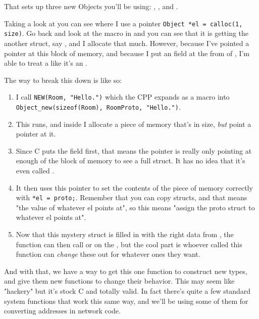 That sets up three new Objects you'll be using: , ,
and .

Taking a look at  you can see where I use a pointer
\verb|Object *el = calloc(1, size)|.  Go back and look at the 
macro in  and you can see that it is getting the 
another struct, say , and I allocate that much.  However, because
I've pointed a  pointer at this block of memory, and because
I put an  field at the from of , I'm able
to treat a  like it's an .

The way to break this down is like so:

\begin{enumerate}
\item I call \verb|NEW(Room, "Hello.")| which the CPP expands as a macro
    into \verb|Object_new(sizeof(Room), RoomProto, "Hello.")|.
\item This runs, and inside  I allocate a piece of memory
    that's  in size, \emph{but} point a  pointer
    at it.
\item Since C puts the  field first, that means the 
    pointer is really only pointing at enough of the block of memory to
    see a full  struct.  It has no idea that it's even called
    .
\item It then uses this  pointer to set the contents of
    the piece of memory correctly with \verb|*el = proto;|.  Remember that
    you can copy structs, and that  means "the value of whatever el points
    at", so this means "assign the proto struct to whatever el points at".
\item Now that this mystery struct is filled in with the right data from
    , the function can then call  or 
    on the , but the cool part is whoever called this function
    can \emph{change} these out for whatever ones they want.
\end{enumerate}

And with that, we have a way to get this one function to construct new types,
and give them new functions to change their behavior.  This may seem like
"hackery" but it's stock C and totally valid.  In fact there's quite a few
standard system functions that work this same way, and we'll be using some of
them for converting addresses in network code.

